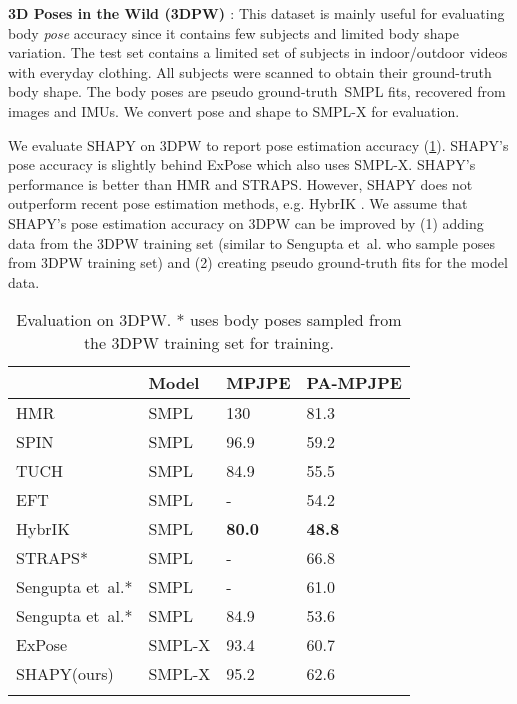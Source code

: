 \documentclass[10pt,twocolumn,letterpaper]{article}
\newcommand{\qheading}[1]{\noindent\textbf{#1}:}
\newcommand{\TODO}[1]{\xspace{\color{red} #1}\xspace}
\renewcommand{\TODO}[1]{\xspace{\color{black} #1}\xspace}
\newcommand{\lookat}[1]{\xspace{\color{black} #1}\xspace}
\newcommand{\modelCOLOR}{black}
\newcommand{\modelname}{{\color{\modelCOLOR}SHAPY}\xspace}
\newcommand{\expose}{\mbox{ExPose}\xspace}
\newcommand{\straps}{\mbox{STRAPS}\xspace}
\newcommand{\hybrik}{\mbox{HybrIK}\xspace}
\newcommand{\threeD}{3D\xspace}
\newcommand{\vspaceTABaboveCaption}{-0.0 em}
\newcommand{\hmr}{\mbox{HMR}\xspace}
\newcommand{\spin}{\mbox{SPIN}\xspace}
\newcommand{\smplx}{\mbox{SMPL-X}\xspace}
\newcommand{\smplX}{\smplx}
\newcommand{\groundtruth}{\mbox{ground-truth}\xspace}
\newcommand{\smpl}{\mbox{SMPL}\xspace}
\newcommand{\threedpw}{\mbox{3DPW}\xspace}
\renewcommand{\etal}{\mbox{et al.}\xspace}
\renewcommand{\eg}{\mbox{e.g.}\xspace}
\begin{document}
\begin{appendices}
\qheading{\threeD Poses in the Wild (\threedpw) \cite{vonMarcard2018}} 
This dataset is mainly useful for evaluating 
body \emph{pose} accuracy since it contains few subjects and limited body shape variation.
The test set contains a limited set of  subjects in indoor/outdoor videos with everyday clothing. \TODO{All subjects were scanned to obtain their ground-truth body shape}. The body poses are pseudo \groundtruth~\smpl fits, recovered from images and IMUs. We convert pose and shape to \smplX for evaluation.

We evaluate \modelname on \threedpw to report pose estimation accuracy (\cref{tab:3dpw}). \modelname's pose accuracy is slightly behind \expose which also uses \smplX.  \lookat{\modelname's performance is better than \hmr \cite{Kanazawa2018_hmr} and \straps \cite{sengupta2020straps}. However, \modelname does not outperform recent pose estimation methods, \eg HybrIK \cite{li2021hybrik}. We assume that \modelname's pose estimation accuracy on \threedpw can be improved by (1) adding data from the \threedpw training set (similar to Sengupta \etal \cite{sengupta2021hierarchicalICCV} who sample poses from \threedpw training set) and (2) creating pseudo ground-truth fits for the model data.}

\begin{table}
\renewcommand{\arraystretch}{1.2} 
\centering
\scriptsize
\begin{tabular}{llll}
    \toprule
    & Model & MPJPE & PA-MPJPE \\
    \midrule
    \hmr    \cite{Kanazawa2018_hmr}                     & \smpl     & 130      & 81.3        \\
	\spin \cite{Kolotouros2019_spin}                    & \smpl     & 96.9     & 59.2        \\
	TUCH \cite{mueller2021tuch}                         & \smpl     & 84.9     & 55.5        \\
	EFT \cite{joo2020eft}                               & \smpl     & -        & 54.2        \\
    \hybrik \cite{li2021hybrik}                         & \smpl     & \textbf{80.0}     & \textbf{48.8}        \\
    \straps \cite{sengupta2020straps}*                   & \smpl     & -        & 66.8        \\
    Sengupta \etal \cite{sengupta2021probabilisticCVPR}* & \smpl     & -        & 61.0        \\
    Sengupta \etal \cite{sengupta2021hierarchicalICCV}*  & \smpl     & 84.9     & 53.6        \\
	\expose \cite{Choutas2020_expose}                   & \smplx    & 93.4     & 60.7        \\
    \modelname (ours)                                   & \smplx    & 95.2     & 62.6         \\ 
    \noalign{\smallskip}
    \bottomrule
\end{tabular}
\vspace{\vspaceTABaboveCaption}
\caption{Evaluation on \threedpw \cite{vonMarcard2018}. * uses body poses sampled from the \threedpw training set for training.
}
\label{tab:3dpw}
\end{table}
  

\end{appendices}
\end{document}
